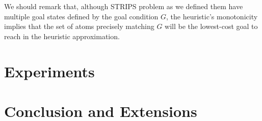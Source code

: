 \documentclass[letterpaper]{article}
\begin{document}
We should remark that, although STRIPS problem as we defined them have multiple goal states defined by the goal condition $G$, the heuristic's monotonicity implies that the set of atoms precisely matching $G$ will be the lowest-cost goal to reach in the heuristic approximation.

\section{Experiments}



\section{Conclusion and Extensions}
\end{document}
